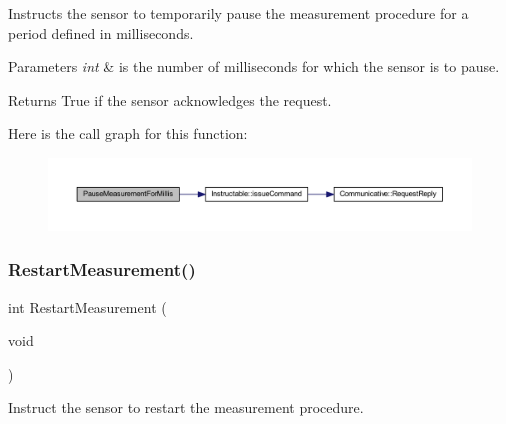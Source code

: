 Instructs the sensor to temporarily pause the measurement procedure for a period defined in milliseconds. 
\begin{DoxyParams}{Parameters}
{\em int} & is the number of milliseconds for which the sensor is to pause. \\
\hline
\end{DoxyParams}
\begin{DoxyReturn}{Returns}
True if the sensor acknowledges the request. 
\end{DoxyReturn}
Here is the call graph for this function\+:
\nopagebreak
\begin{figure}[H]
\begin{center}
\leavevmode
\includegraphics[width=350pt]{class_sensor_afdcc3b63357bd24f519e0cbc85454a52_cgraph}
\end{center}
\end{figure}
\mbox{\label{class_sensor_ad58e9acfc23f07af433f0e2596d786d7}} 
\subsubsection{\texorpdfstring{RestartMeasurement()}{RestartMeasurement()}}
{\footnotesize\ttfamily int Restart\+Measurement (\begin{DoxyParamCaption}\item[{void}]{ }\end{DoxyParamCaption})}



Instruct the sensor to restart the measurement procedure. 

